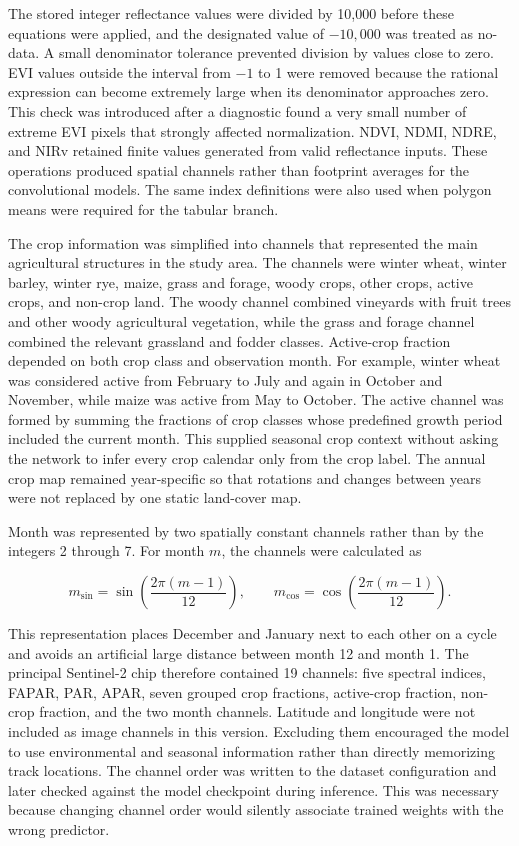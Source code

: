 The stored integer reflectance values were divided by 10,000 before these equations were applied, and the designated value of $-10{,}000$ was treated as no-data. A small denominator tolerance prevented division by values close to zero. EVI values outside the interval from $-1$ to 1 were removed because the rational expression can become extremely large when its denominator approaches zero. This check was introduced after a diagnostic found a very small number of extreme EVI pixels that strongly affected normalization. NDVI, NDMI, NDRE, and NIRv retained finite values generated from valid reflectance inputs. These operations produced spatial channels rather than footprint averages for the convolutional models. The same index definitions were also used when polygon means were required for the tabular branch.

The crop information was simplified into channels that represented the main agricultural structures in the study area. The channels were winter wheat, winter barley, winter rye, maize, grass and forage, woody crops, other crops, active crops, and non-crop land. The woody channel combined vineyards with fruit trees and other woody agricultural vegetation, while the grass and forage channel combined the relevant grassland and fodder classes. Active-crop fraction depended on both crop class and observation month. For example, winter wheat was considered active from February to July and again in October and November, while maize was active from May to October. The active channel was formed by summing the fractions of crop classes whose predefined growth period included the current month. This supplied seasonal crop context without asking the network to infer every crop calendar only from the crop label. The annual crop map remained year-specific so that rotations and changes between years were not replaced by one static land-cover map.

Month was represented by two spatially constant channels rather than by the integers 2 through 7. For month $m$, the channels were calculated as

\begin{equation}
    m_{\sin}=\sin\!\left(\frac{2\pi(m-1)}{12}\right),\qquad
    m_{\cos}=\cos\!\left(\frac{2\pi(m-1)}{12}\right).
    \label{eq:cyclical_month}
\end{equation}

This representation places December and January next to each other on a cycle and avoids an artificial large distance between month 12 and month 1. The principal Sentinel-2 chip therefore contained 19 channels: five spectral indices, FAPAR, PAR, APAR, seven grouped crop fractions, active-crop fraction, non-crop fraction, and the two month channels. Latitude and longitude were not included as image channels in this version. Excluding them encouraged the model to use environmental and seasonal information rather than directly memorizing track locations. The channel order was written to the dataset configuration and later checked against the model checkpoint during inference. This was necessary because changing channel order would silently associate trained weights with the wrong predictor.

